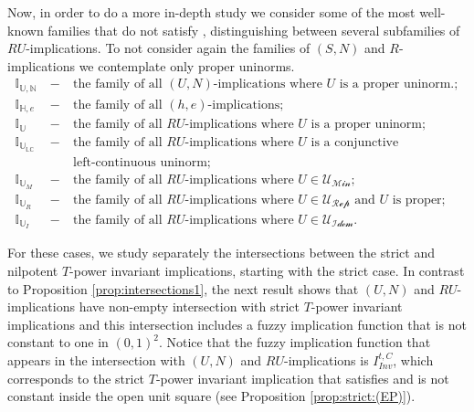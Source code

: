Now, in order to do a more in-depth study we consider some of the most well-known families that do not satisfy \NP, distinguishing between several subfamilies of $RU$-implications. To not consider again the families of $(S,N)$ and $R$-implications we contemplate only proper uninorms.
\begin{eqnarray*}
	\mathbb{I}_{\mathbb{U},\mathbb{N}} &~-~& \text{the family of all $(U,N)$-implications where $U$ is a proper uninorm.};\\
	\mathbb{I}_{\mathbb{H},e} &~-~& \text{the family of all $(h,e)$-implications};\\
	\mathbb{I}_{\mathbb{U}} &~-~& \text{the family of all $RU$-implications where $U$ is a proper uninorm};\\
	\mathbb{I}_{\mathbb{U}_{\mathbb{LC}}} &~-~& \text{the family of all $RU$-implications where $U$ is a conjunctive} \\
										& & \text{left-continuous uninorm};\\
	\mathbb{I}_{\mathbb{U}_{M}} &~-~& \text{the family of all $RU$-implications where $U \in \mathcal{U_{\text{Min}}}$};\\
	\mathbb{I}_{\mathbb{U}_{R}} &~-~& \text{the family of all $RU$-implications where $U \in \mathcal{U_{\text{Rep}}}$ and $U$ is proper}; \\
	\mathbb{I}_{\mathbb{U}_{I}} &~-~& \text{the family of all $RU$-implications where $U \in \mathcal{U_{\text{Idem}}}$}.
\end{eqnarray*}

For these cases, we study separately the intersections between the strict and nilpotent $T$-power invariant implications, starting with the strict case. In contrast to Proposition \ref{prop:intersections1}, the next result shows that $(U,N)$ and $RU$-implications have non-empty intersection with strict $T$-power invariant implications and this intersection includes a fuzzy implication function that is not constant to one in $(0,1)^2$. Notice that the fuzzy implication function that appears in the intersection with $(U,N)$ and $RU$-implications is $I_{Inv}^{t,C}$, which corresponds to the strict $T$-power invariant implication that satisfies \EP and is not constant inside the open unit square (see Proposition \ref{prop:strict:(EP)}).

